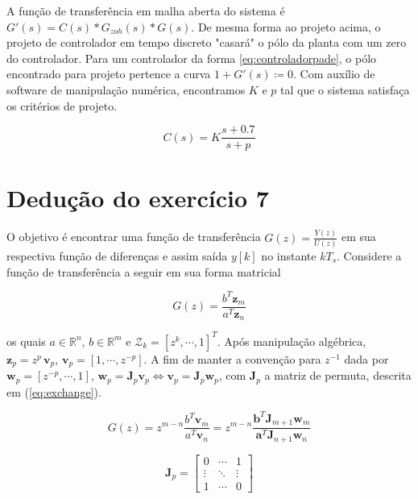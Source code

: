 \documentclass[twoside, fleqn]{article}
\begin{document}
    A função de transferência em malha aberta do sistema é $G'(s) = C(s)*G_{zoh}(s)*G(s)$. De mesma forma ao projeto acima, o projeto de controlador em tempo discreto "casará" o pólo da planta com um zero do controlador. Para um controlador da forma \eqref{eq:controladorpade}, o pólo encontrado para projeto pertence a curva $1 + G'(s) \coloneqq 0$.   Com auxílio de software de manipulação numérica, encontramos $K$ e $p$ tal que o sistema satisfaça os critérios de  projeto. 

    \begin{equation}
    \label{eq:controladorpade}
        C(s) = K \frac{s + 0.7}{s + p}
    \end{equation}
    
    

\section*{Dedução do exercício 7}
\label{sec:deducao7}

    O objetivo é encontrar uma função de transferência $G(z) = \frac{Y(z)}{U(z)}$ em sua respectiva função de diferenças e assim saída $y[k]$ no instante $k T_s$. Considere a função de transferência a seguir em sua forma matricial
    
        \begin{equation}
            G(z) = \frac{b^T \textbf{z}_m}{a^T \textbf{z}_n}    
            \label{eq:Gz}
        \end{equation}
    
    os quais $a \in \mathbb{R}^n$, $b \in \mathbb{R}^m$ e $\mathcal{Z}_k = \left[z^k, \cdots, 1\right]^T$. Após manipulação algébrica, $\textbf{z}_p = z^p \, \textbf{v}_p$, $\textbf{v}_p = [1, \cdots, z^{-p}]$. A fim de manter a convenção para $z^{-1}$ dada por $\textbf{w}_p =  [z^{-p}, \cdots, 1]$, $\textbf{w}_p = \textbf{J}_p \textbf{v}_p \Leftrightarrow{\textbf{v}_p = \textbf{J}_p \textbf{w}_p}$, com $\textbf{J}_p$ a matriz de permuta, descrita em (\ref{eq:exchange}).
    
        \begin{equation}
            G(z) = z^{m-n}\frac{b^T \textbf{v}_m}{a^T \textbf{v}_n} = z^{m-n} \frac{\textbf{b}^T \textbf{J}_{m+1} \textbf{w}_m}{\textbf{a}^T \textbf{J}_{n+1} \textbf{w}_n}
        \label{eq:Gv}
        \end{equation}
    
        \begin{equation}
            \textbf{J}_p = 
            \begin{bmatrix}
                0&\cdots&1\\
                \vdots & \ddots & \vdots\\
                1&\cdots&0
            \end{bmatrix}
            \label{eq:exchange}
        \end{equation}
    
\end{document}
